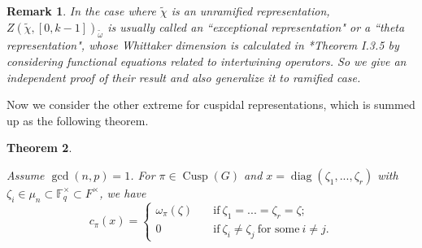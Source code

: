 \documentclass{amsart}
\numberwithin{equation}{section}
\newtheorem{theorem}{\bf{Theorem}}[section]
\newtheorem{remark}[theorem]{\bf{Remark}}
\newcommand{\mrdiag}{\operatorname{diag}}
\newcommand{\mrgcd}{\operatorname{gcd}}
\newcommand{\mrcusp}{\operatorname{Cusp}}
\newcommand{\mbf}{\mathbb{F}}
\newcommand{\wt}[1]{\widetilde{#1}}
\begin{document}
		\begin{remark}
			
			In the case where $\wt{\chi}$ is an unramified representation,  $Z(\wt{\chi},[0,k-1])_{\wt{\omega}}$ is usually called an ``exceptional representation" or a ``theta representation", whose Whittaker dimension is calculated in \cite{kazhdan1984metaplectic}*{Theorem I.3.5} by considering functional equations related to intertwining operators. So we give an independent proof of their result and also generalize it to ramified case.
			
		\end{remark}
		
		Now we consider the other extreme for cuspidal representations, which is summed up as the following theorem.
		
		\begin{theorem}\label{thmcalcpi}
			
			Assume $\mrgcd(n,p)=1$. For $\pi\in\mrcusp(G)$ and $x=\mrdiag(\zeta_{1},...,\zeta_{r})$ with $\zeta_{i}\in\mu_{n}\subset\mbf_{q}^{\times}\subset F^{\times}$, we have
			$$c_{\pi}(x)=\begin{cases} \omega_{\pi}(\zeta)\quad&\text{if}\ \zeta_{1}=...=\zeta_{r}=\zeta;\\
				0\quad&\text{if}\ \zeta_{i}\neq\zeta_{j}\ \text{for some}\ i\neq j.  \end{cases}$$ 
			
			
		\end{theorem}
		
\end{document}
